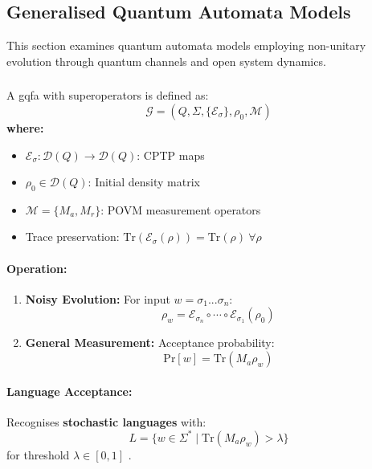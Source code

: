\subsection{Generalised Quantum Automata Models}
\label{sec:gqfa}

This section examines quantum automata models employing non-unitary evolution through quantum channels and open system dynamics.

\subsubsection{}
\label{subsec:gqfa}

\begin{definition}
A \gls{gqfa} with superoperators is defined as:
\[
\mathcal{G} = (Q, \Sigma, \{\mathcal{E}_\sigma\}, \rho_0, \mathcal{M})
\]
\textbf{where:}
\begin{itemize}
    \item $\mathcal{E}_\sigma: \mathcal{D}(Q) \rightarrow \mathcal{D}(Q)$: CPTP maps
    \item $\rho_0 \in \mathcal{D}(Q)$: Initial density matrix
    \item $\mathcal{M} = \{M_a, M_r\}$: POVM measurement operators
    \item Trace preservation: $\text{Tr}(\mathcal{E}_\sigma(\rho)) = \text{Tr}(\rho)\ \forall\rho$
\end{itemize}
\end{definition}

\paragraph{Operation:}
\begin{enumerate}
    \item \textbf{Noisy Evolution:} For input $w = \sigma_1...\sigma_n$:
    \[
    \rho_w = \mathcal{E}_{\sigma_n} \circ \cdots \circ \mathcal{E}_{\sigma_1} (\rho_0)
    \]
    \item \textbf{General Measurement:} Acceptance probability:
    \[
    \text{Pr}[w] = \text{Tr}(M_a \rho_w)
    \]
\end{enumerate}

\paragraph{Language Acceptance:}
Recognises \textbf{stochastic languages} with:
\[
L = \{w \in \Sigma^* \mid \text{Tr}(M_a \rho_w) > \lambda\}
\]
for threshold $\lambda \in [0,1]$ \cite{hirvensalo2012quantum}.

